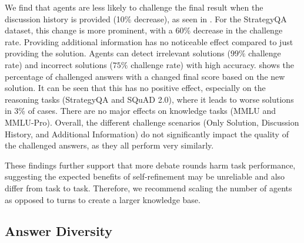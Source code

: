 We find that agents are less likely to challenge the final result when the discussion history is provided (10\% decrease), as seen in .
For the StrategyQA dataset, this change is more prominent, with a 60\% decrease in the challenge rate.
Providing additional information has no noticeable effect compared to just providing the solution.
Agents can detect irrelevant solutions ($99\%$ challenge rate) and incorrect solutions ($75\%$ challenge rate) with high accuracy.
 shows the percentage of challenged answers with a changed final score based on the new solution.
It can be seen that this has no positive effect, especially on the reasoning tasks (StrategyQA and SQuAD 2.0), where it leads to worse solutions in 3\% of cases.
There are no major effects on knowledge tasks (MMLU and MMLU-Pro).
Overall, the different challenge scenarios (Only Solution, Discussion History, and Additional Information) do not significantly impact the quality of the challenged answers, as they all perform very similarly.

These findings further support that more debate rounds harm task performance, suggesting the expected benefits of self-refinement may be unreliable and also differ from task to task.
Therefore, we recommend scaling the number of agents as opposed to turns to create a larger knowledge base.%



\subsection{Answer Diversity}

\label{sec:experiment2}


 
\begin{table*}[t]
\centering
{}
\caption{Final answer similarity based on average cosine similarity between SBERT embeddings of final answers compared to task performance on StrategyQA dataset.
\vspace{-0.5cm}}
\label{tab:embed-strategies-transposed}
\end{table*}

